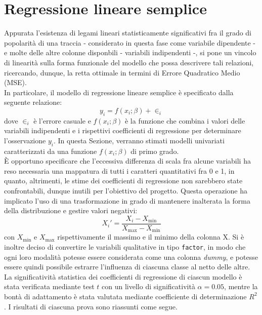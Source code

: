 \documentclass[fleqn,10pt]{SelfArx} %
\begin{document}
\section{Regressione lineare semplice}
Appurata l’esistenza di legami lineari statisticamente significativi fra il grado di popolarità di una traccia - considerato in questa fase come variabile dipendente - e molte delle altre colonne disponbili - variabili indipendenti -, si pone un vincolo di linearità sulla forma funzionale del modello che possa descrivere tali relazioni, ricercando, dunque, la retta ottimale in termini di Errore Quadratico Medio (MSE).\\
In particolare, il modello di regressione lineare semplice è specificato dalla seguente relazione:
\begin{equation}
    y_i=f(x_i;\beta)+\in_i
\end{equation}
dove $\in_i$ è l'errore casuale e $f(x_i;\beta)$ è la funzione che combina i valori delle variabili indipendenti e i rispettivi coefficienti di regressione per determinare l'osservazione $y_i$. In questa Sezione, verranno stimati modelli univariati caratterizzati da una funzione $f(x_i;\beta)$ di primo grado.\\
È opportuno specificare che l'eccessiva differenza di scala fra alcune variabili ha reso necessaria una mappatura di tutti i caratteri quantitativi fra 0 e 1, in quanto, altrimenti, le stime dei coefficienti di regressione non sarebbero state confrontabili, dunque inutili per l'obiettivo del progetto. Questa operazione ha implicato l'uso di una trasformazione in grado di mantenere inalterata la forma della distribuzione e gestire valori negativi:
\begin{equation}
    X_i'=\frac{X_i-X_{\text{min}}}{X_{\text{max}}-X_{\text{min}}}
\end{equation}
con $X_{\text{min}}$ e $X_{\text{max}}$ rispettivamente il massimo e il minimo della colonna X. Si è inoltre deciso di convertire le variabili qualitative in tipo \texttt{factor}, in modo che ogni loro modalità potesse essere considerata come una colonna \textit{dummy}, e potesse essere quindi possibile estrarre l'influenza di ciascuna classe al netto delle altre.\\
La significatività statistica dei coefficienti di regressione di ciascun modello è stata verificata mediante test $t$ con un livello di significatività $\alpha=0.05$, mentre la bontà di adattamento è stata valutata mediante coefficiente di determinazione $R^2$.
I risultati di ciascuna prova sono riassunti come segue.
\end{document}
